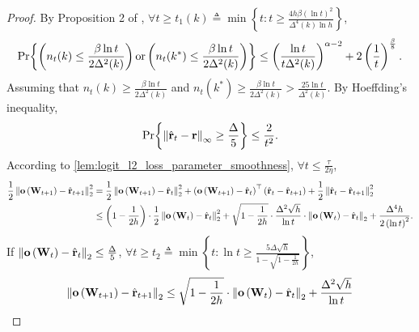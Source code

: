 \begin{proof}
    By Proposition 2 of \citep{seldin2017improved},
    $\forall t \ge t_1(k) \triangleq \min{\left\{ t : t \ge \frac{4 h \beta \left(\ln{t}\right)^2}{\Delta^4(k) \ln{h}} \right\}}$,
\begin{equation*}
\begin{split}
    {\text{Pr}}{\left\{ \left( n_t(k) \le \frac{\beta \ln{t}}{2 \Delta^2(k)} \right) \text{or} \left( n_t(k^*) \le \frac{\beta \ln{t}}{2 \Delta^2(k)} \right) \right\}} \le \left( \frac{\ln{t}}{t \Delta^2(k)} \right)^{\alpha - 2} + 2 \left(\frac{1}{t}\right)^{\frac{\beta}{8}}.
\end{split}
\end{equation*}
Assuming that $n_t(k) \ge \frac{\beta \ln{t}}{2 \Delta^2(k)}$ and $n_t(k^*) \ge \frac{\beta \ln{t}}{2 \Delta^2(k)} > \frac{25 \ln{t}}{\Delta^2(k)}$. By Hoeffding's inequality,
\begin{equation*}
\begin{split}
    {\text{Pr}}{\left\{ \left\| \hat{{\mathbf{r}}}_t - {\mathbf{r}}\right\|_\infty \ge \frac{\Delta}{5} \right\}} \le \frac{2}{t^2}.
\end{split}
\end{equation*}
According to \cref{lem:logit_l2_loss_parameter_smoothness}, $\forall t \le \frac{\tau}{2 \eta}$,
\begin{equation*}
\begin{split}
    \frac{1}{2} \left\| {\mathbf{o}}\left( {\mathbf{W}}_{t+1} \right) - \hat{{\mathbf{r}}}_{t+1}\right\|_2^2 &= \frac{1}{2} \left\| {\mathbf{o}}\left( {\mathbf{W}}_{t+1} \right) - \hat{{\mathbf{r}}}_t\right\|_2^2 + \left( {\mathbf{o}}\left( {\mathbf{W}}_{t+1} \right) - \hat{{\mathbf{r}}}_t \right)^\top \left( \hat{{\mathbf{r}}}_t - \hat{{\mathbf{r}}}_{t+1} \right) + \frac{1}{2} \left\| \hat{{\mathbf{r}}}_t - \hat{{\mathbf{r}}}_{t+1} \right\|_2^2 \\
    &\le \left( 1 - \frac{1}{2 h} \right) \cdot \frac{1}{2} \left\| {\mathbf{o}}\left( {\mathbf{W}}_t \right) - \hat{{\mathbf{r}}}_t\right\|_2^2 + \sqrt{1 - \frac{1}{2 h} } \cdot \frac{\Delta^2 \sqrt{h}}{\ln{t}} \cdot \left\| {\mathbf{o}}\left( {\mathbf{W}}_t \right) - \hat{{\mathbf{r}}}_t\right\|_2 + \frac{\Delta^4 h}{2 \left( \ln{t} \right)^2 }.
\end{split}
\end{equation*}
If $\left\| {\mathbf{o}}\left( {\mathbf{W}}_t \right) - \hat{{\mathbf{r}}}_t\right\|_2 \le \frac{\Delta}{5}$, $\forall t \ge t_2 \triangleq \min\left\{ t: \ln{t} \ge \frac{5 \Delta \sqrt{h}}{1 - \sqrt{1 - \frac{1}{2 h}}} \right\}$,
\begin{equation*}
\begin{split}
    \left\| \rvo\left( \rmW_{t+1} \right) - \hat{\rvr}_{t+1}\right\|_2 &\le \sqrt{1 - \frac{1}{2 h}} \cdot \left\| \rvo\left( \rmW_t \right) - \hat{\rvr}_t\right\|_2 + \frac{\Delta^2 \sqrt{h}}{\ln{t}} \\

\end{split}
\end{equation*}
\end{proof}
